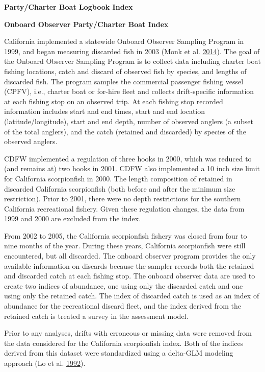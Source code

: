 \documentclass[12pt,]{article}
\begin{document}
\textbf{Party/Charter Boat Logbook Index}

\textbf{Onboard Observer Party/Charter Boat Index}

California implemented a statewide Onboard Observer Sampling Program in
1999, and began measuring discarded fish in 2003 (Monk et al.
\protect\hyperlink{ref-Monk2014}{2014}). The goal of the Onboard
Observer Sampling Program is to collect data including charter boat
fishing locations, catch and discard of observed fish by species, and
lengths of discarded fish. The program samples the commercial passenger
fishing vessel (CPFV), i.e., charter boat or for-hire fleet and collects
drift-specific information at each fishing stop on an observed trip. At
each fishing stop recorded information includes start and end times,
start and end location (latitude/longitude), start and end depth, number
of observed anglers (a subset of the total anglers), and the catch
(retained and discarded) by species of the observed anglers.

CDFW implemented a regulation of three hooks in 2000, which was reduced
to (and remains at) two hooks in 2001. CDFW also implemented a 10 inch
size limit for California scorpionfish in 2000. The length composition
of retained in discarded California scorpionfish (both before and after
the minimum size restriction). Prior to 2001, there were no depth
restrictions for the southern California recreational fishery. Given
these regulation changes, the data from 1999 and 2000 are excluded from
the index.

From 2002 to 2005, the California scorpionfish fishery was closed from
four to nine months of the year. During these years, California
scorpionfish were still encountered, but all discarded. The onboard
observer program provides the only available information on discards
because the sampler records both the retained and discarded catch at
each fishing stop. The onboard observer data are used to create two
indices of abundance, one using only the discarded catch and one using
only the retained catch. The index of discarded catch is used as an
index of abundance for the recreational discard fleet, and the index
derived from the retained catch is treated a survey in the assessment
model.

Prior to any analyses, drifts with erroneous or missing data were
removed from the data considered for the California scorpionfish index.
Both of the indices derived from this dataset were standardized using a
delta-GLM modeling approach (Lo et al.
\protect\hyperlink{ref-Lo1992}{1992}).
\end{document}
